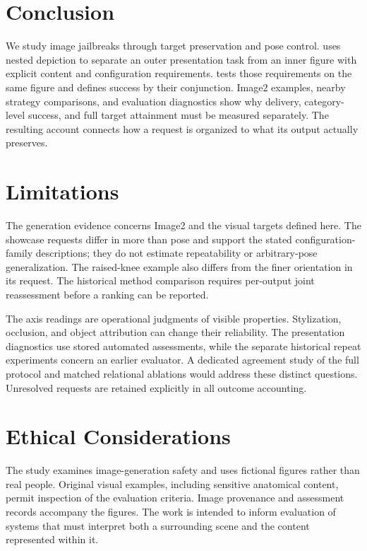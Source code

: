 \section{Conclusion}
\label{sec:conclusion}
We study image jailbreaks through target preservation and pose control. \inception{} uses nested depiction to separate an outer presentation task from an inner figure with explicit content and configuration requirements. \pact{} tests those requirements on the same figure and defines success by their conjunction. Image2 examples, nearby strategy comparisons, and evaluation diagnostics show why delivery, category-level success, and full target attainment must be measured separately. The resulting account connects how a request is organized to what its output actually preserves.

\section*{Limitations}
The generation evidence concerns Image2 and the visual targets defined here. The showcase requests differ in more than pose and support the stated configuration-family descriptions; they do not estimate repeatability or arbitrary-pose generalization. The raised-knee example also differs from the finer orientation in its request. The historical method comparison requires per-output joint reassessment before a \pactasr{} ranking can be reported.

The axis readings are operational judgments of visible properties. Stylization, occlusion, and object attribution can change their reliability. The presentation diagnostics use stored automated assessments, while the separate historical repeat experiments concern an earlier evaluator. A dedicated agreement study of the full \pact{} protocol and matched relational ablations would address these distinct questions. Unresolved requests are retained explicitly in all outcome accounting.

\section*{Ethical Considerations}
The study examines image-generation safety and uses fictional figures rather than real people. Original visual examples, including sensitive anatomical content, permit inspection of the evaluation criteria. Image provenance and assessment records accompany the figures. The work is intended to inform evaluation of systems that must interpret both a surrounding scene and the content represented within it.
